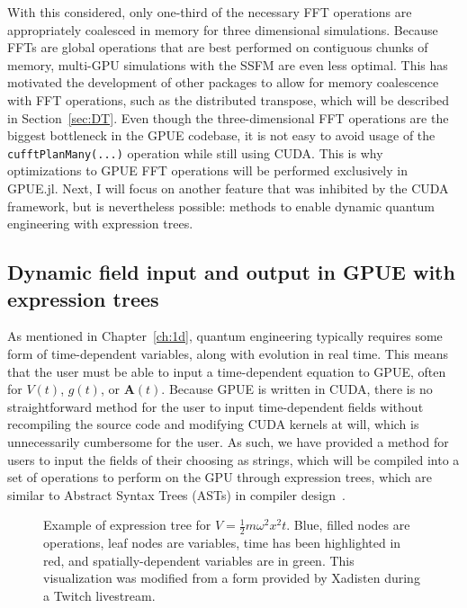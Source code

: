 
With this considered, only one-third of the necessary FFT operations are appropriately coalesced in memory for three dimensional simulations.
Because FFTs are global operations that are best performed on contiguous chunks of memory, multi-GPU simulations with the SSFM are even less optimal.
This has motivated the development of other packages to allow for memory coalescence with FFT operations, such as the distributed transpose, which will be described in Section~\ref{sec:DT}.
Even though the three-dimensional FFT operations are the biggest bottleneck in the GPUE codebase, it is not easy to avoid usage of the \texttt{cufftPlanMany(...)} operation while still using CUDA.
This is why optimizations to GPUE FFT operations will be performed exclusively in GPUE.jl.
Next, I will focus on another feature that was inhibited by the CUDA framework, but is nevertheless possible: methods to enable dynamic quantum engineering with expression trees.

\subsection{Dynamic field input and output in GPUE with expression trees}

\label{sec:expr_trees}
As mentioned in Chapter~\ref{ch:1d}, quantum engineering typically requires some form of time-dependent variables, along with evolution in real time.
This means that the user must be able to input a time-dependent equation to GPUE, often for $V(t)$, $g(t)$, or $\mathbf{A}(t)$.
Because GPUE is written in CUDA, there is no straightforward method for the user to input time-dependent fields without recompiling the source code and modifying CUDA kernels at will, which is unnecessarily cumbersome for the user.
As such, we have provided a method for users to input the fields of their choosing as strings, which will be compiled into a set of operations to perform on the GPU through expression trees, which are similar to Abstract Syntax Trees (ASTs) in compiler design~\cite{cohen1991, reyes2011}.

\begin{figure}
\center 
\caption{
Example of expression tree for $V=\frac{1}{2}m \omega^2 x^2 t$.
Blue, filled nodes are operations, leaf nodes are variables, time has been highlighted in red, and spatially-dependent variables are in green.
This visualization was modified from a form provided by Xadisten during a Twitch livestream.
}
\label{fig:expr_tree}
\end{figure}

